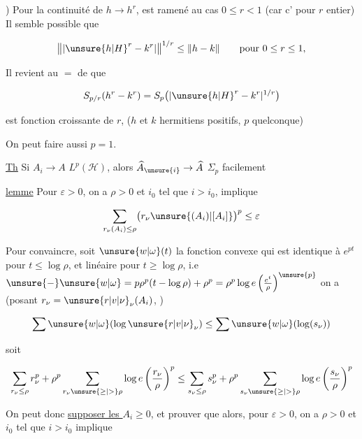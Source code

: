 ) Pour la continuité de $h\to h^r$,  est ramené au cas $0\leq r<1$ (car c'  pour $r$ entier) Il semble possible que

\[
\bigl\|\lvert {\unsure{h|H}}^r-k^r\rvert\bigr\|^{1/r}\leq\|h-k\|\qquad\text{pour }0\leq r\leq1,
\]

Il revient au $=$ de  que

\[
S_{p/r}(h^r-k^r)=S_p\bigl(\lvert {\unsure{h|H}}^r-k^r\rvert^{1/r}\bigr)
\]

est fonction croissante de $r$, ($h$ et $k$ hermitiens positifs, $p$ quelconque)

On peut faire aussi $p=1$.

\uline{Th} Si $A_i\to A$  $L^p(\mathscr H)$, alors $\widehat A_{\unsure{i}}\to\widehat A$  $\Sigma_p$
 facilement 

\uline{lemme} Pour  $\varepsilon>0$, on a $\rho>0$ et $i_0$ tel que $i>i_0$, implique

\[
\sum_{r_\nu(A_i)\leq\rho}\bigl(r_\nu\unsure{(A_i)|[A_i]}\bigr)^p\leq\varepsilon
\]

Pour  convaincre, soit $\unsure{w|\omega}(t)$ la fonction convexe qui est identique à $e^{pt}$ pour $t\leq\log\rho$, et linéaire pour $t\geq\log\rho$, i.e $\unsure{-}\unsure{w|\omega}=p\rho^p(t-\log\rho)+\rho^p=\rho^p\log e\left(\frac{e^t}{\rho}\right)^{\unsure{p}}$ on a (posant $r_\nu=\unsure{r|v|\nu}_\nu(A_i)$, )


\[
\sum \unsure{w|\omega}(\log\unsure{r|v|\nu}_\nu)\leq\sum \unsure{w|\omega}(\log(s_\nu))
\]

soit

\[
\sum_{r_\nu\leq\rho}r_\nu^p+\rho^p\sum_{r_\nu\unsure{\geq|>}\rho}\log e\left(\frac{r_\nu}{\rho}\right)^p
\leq\sum_{s_\nu\leq\rho}s_\nu^p+\rho^p\sum_{s_\nu\unsure{\geq|>}\rho}\log e\left(\frac{s_\nu}{\rho}\right)^p
\]

On peut donc \uline{supposer les $A_i\geq0$},  et prouver que alors, pour  $\varepsilon>0$, on a $\rho>0$ et $i_0$ tel que $i>i_0$ implique

